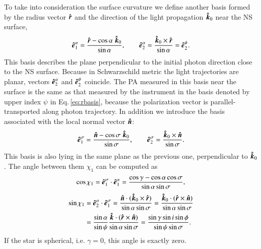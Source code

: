 \documentclass{aa}
\newcommand{\be}{\begin{equation}}
\newcommand{\ee}{\end{equation}}
\newcommand{\unit}[1]{\mbox{\boldmath $\hat{#1}$}}
\begin{document}
To take into consideration the surface curvature we define another basis formed by the radius vector $\unit{r}$ and the direction of the light propagation $\unit{k}_0$ near the NS surface,
\be\label{eq:basis}
\unit{e}^{\alpha}_1 = \frac{\unit{r}-\cos{\alpha}\  \unit{k}_0}{\sin{\alpha}},\qquad 
\unit{e}^{\alpha}_2 = \frac{\unit{k}_0 \times \unit{r}}{\sin{\alpha}}=\unit{e}^{\psi}_2.
\ee
This basis describes the plane perpendicular to the initial photon direction close to the NS surface.
Because in Schwarzschild metric the light trajectories are planar, vectors $\unit{e}^{\alpha}_2$ and $\unit{e}^{\psi}_2$ coincide. 
The PA measured in this basis near the surface is the same as that measured by the instrument in the basis denoted by upper index $\psi$ in Eq.\,\eqref{eq:rbasis}, because the polarization vector is parallel-transported along photon trajectory.
In addition we introduce the basis associated with the local normal vector  $\unit{n}$:
\be\label{eq:nbasis}
\unit{e}_1^{\sigma} = \frac{\unit{n}-\cos{\sigma}\  \unit{k}_0}{\sin{\sigma}},\qquad 
\unit{e}_2^{\sigma} = \frac{\unit{k}_0 \times \unit{n}}{\sin{\sigma}} .
\ee
This basis is also lying in the same plane as the previous one, perpendicular to $\unit{k}_0$.
The angle between them $\chi_1$ can be computed as
\be
\cos{\chi_1}=\unit{e}_1^{\sigma} \cdot \unit{e}^{\alpha}_1 = \frac{\cos\gamma-\cos\alpha\cos\sigma}{\sin{\alpha}\sin\sigma} , 
\ee
\begin{align}\label{eq:chi1}
\sin{\chi_1} &= \unit{e}^{\alpha}_2 \cdot \unit{e}^{\sigma}_1 = \frac{\unit{n} \cdot (\unit{k}_0\times\unit{r} )}{\sin\alpha\sin\sigma}
= \frac{\unit{k}_0 \cdot (\unit{r}\times\unit{n} )}{\sin\alpha\sin\sigma} \nonumber \\
&= \frac{\sin\alpha}{\sin\psi} \frac{ \unit{k} \cdot (\unit{r}\times\unit{n} )}{\sin\alpha\sin\sigma}
= \frac{ \sin\gamma\sin i \sin\phi}{\sin\psi\sin\sigma}.
\end{align}
If the star is spherical, i.e. $\gamma=0$, this angle is exactly zero.
\end{document}
